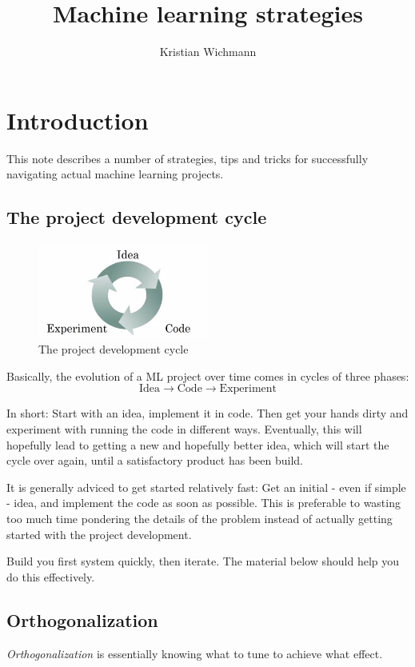 \documentclass[12pt, a4paper]{article}
\title{Machine learning strategies}
\author{Kristian Wichmann}
\numberwithin{equation}{section}
\begin{document}
\maketitle

\section{Introduction}
This note describes a number of strategies, tips and tricks for successfully navigating actual machine learning projects.

\subsection{The project development cycle}

\begin{figure}
\centering
\includegraphics[width = 0.5\textwidth]{dev_cycle}
\caption{The project development cycle}
\label{fig:cycle}
\end{figure}

Basically, the evolution of a ML project over time comes in cycles of three phases:
\begin{equation}
\textrm{Idea}\rightarrow\textrm{Code}\rightarrow\textrm{Experiment}
\end{equation}

In short: Start with an idea, implement it in code. Then get your hands dirty and experiment with running the code in different ways. Eventually, this will hopefully lead to getting a new and hopefully better idea, which will start the cycle over again, until a satisfactory product has been build.

It is generally adviced to get started relatively fast: Get an initial - even if simple - idea, and implement the code as soon as possible. This is preferable to wasting too much time pondering the details of the problem instead of actually getting started with the project development. 

Build you first system quickly, then iterate. The material below should help you do this effectively.

\subsection{Orthogonalization}
\textit{Orthogonalization} is essentially knowing what to tune to achieve what effect.
\end{document}
